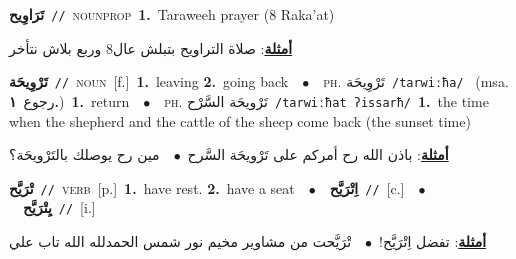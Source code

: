 \documentclass[10pt,a4paper,twoside]{article} %
\begin{document}
\begin{multicols}{2}
{\setlength\topsep{0pt}\textbf{\foreignlanguage{arabic}{تَرَاوِيح}}\ {\color{gray}\texttt{//}\color{black}}\ \textsc{noun\textunderscore prop}\ \textbf{1.}~Taraweeh prayer (8 Raka'at)\  \begin{flushright}\color{gray}\foreignlanguage{arabic}{\textbf{\underline{\foreignlanguage{arabic}{أمثلة}}}: صلاة التراويح بتبلش عال8 وربع بلاش نتأخر}\end{flushright}\color{black}} \vspace{2mm}

{\setlength\topsep{0pt}\textbf{\foreignlanguage{arabic}{تَرْوِيحَة}}\ {\color{gray}\texttt{//}\color{black}}\ \textsc{noun}\ [f.]\ \textbf{1.}~leaving  \textbf{2.}~going back\ \ $\bullet$\ \ \textsc{ph.} \color{gray} \foreignlanguage{arabic}{تَرْوِيحَة}\color{black}\ {\color{gray}\texttt{/{\sffamily tarwiːħa}/}\color{black}}\ \color{gray} (msa. \foreignlanguage{arabic}{رجوع}~\foreignlanguage{arabic}{\textbf{١.}})\color{black}\ \textbf{1.}~return\ \ $\bullet$\ \ \textsc{ph.} \color{gray} \foreignlanguage{arabic}{تَرْويحَة السَّرْح}\color{black}\ {\color{gray}\texttt{/{\sffamily tarwiːħat ʔissarħ}/}\color{black}}\ \textbf{1.}~the time when the shepherd and the cattle of the sheep come back (the sunset time)\  \begin{flushright}\color{gray}\foreignlanguage{arabic}{\textbf{\underline{\foreignlanguage{arabic}{أمثلة}}}: باذن الله رح أمركم على تَرْويحَة السَّرح\ $\bullet$\ \  مين رح يوصلك بالتَرْويحَة؟}\end{flushright}\color{black}} \vspace{2mm}

{\setlength\topsep{0pt}\textbf{\foreignlanguage{arabic}{تْرَيَّح}}\ {\color{gray}\texttt{//}\color{black}}\ \textsc{verb}\ [p.]\ \textbf{1.}~have rest.  \textbf{2.}~have a seat\ \ $\bullet$\ \ \setlength\topsep{0pt}\textbf{\foreignlanguage{arabic}{اِتْرَيَّح}}\ {\color{gray}\texttt{//}\color{black}}\ [c.]\ \ $\bullet$\ \ \setlength\topsep{0pt}\textbf{\foreignlanguage{arabic}{يِتْرَيَّح}}\ {\color{gray}\texttt{//}\color{black}}\ [i.]\  \begin{flushright}\color{gray}\foreignlanguage{arabic}{\textbf{\underline{\foreignlanguage{arabic}{أمثلة}}}: تفضل اِتْرَيَّح!\ $\bullet$\ \  تْرَيَّحت من مشاوير مخيم نور شمس الحمدلله الله تاب علي}\end{flushright}\color{black}} \vspace{2mm}


\end{multicols}
\end{document}
